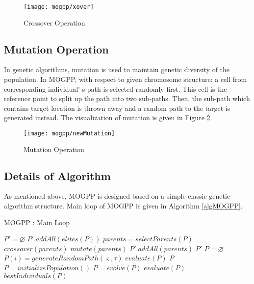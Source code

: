 \begin{figure}
\centering
\texttt{[image: mogpp/xover]}
\caption{Crossover Operation}
\label{fig:xover}
\end{figure}

\subsection{Mutation Operation}

In genetic algorithms, mutation is used to maintain genetic diversity of the population. In MOGPP, with respect to given chromosome structure; a cell from corresponding individual' s path is selected randomly first. This cell is the reference point to split up the path into two sub-paths. Then, the sub-path which contains target location is thrown away and a random path to the target is generated instead. The visualization of mutation is given in Figure \ref{fig:mutation}.

\begin{figure}
\centering
\texttt{[image: mogpp/newMutation]}
\caption{Mutation Operation}
\label{fig:mutation}
\end{figure}

\subsection{Details of Algorithm}

As mentioned above, MOGPP is designed based on a simple classic genetic algorithm structure. Main loop of MOGPP is given in Algorithm \ref{algMOGPP}.

\begin{algorithm}
	\caption{MOGPP : Main Loop}
	\label{algMOGPP}
    \begin{algorithmic}[1]
	  	\State $P' = \varnothing$
	  	\State $P'.addAll(elites(P))$
	  		\State $parents = selectParents(P)$
	  		\State $crossover(parents)$
	  		\State $mutate(parents)$
		  	\State $P'.addAll(parents)$
	  	\EndWhile
	  	\State \Return $P'$
      \EndFunction
   	  \Statex
      	\State $P = \varnothing$
      		\State $P(i) = generateRandomPath(\varsigma, \tau)$
      	\EndFor
      	\State $evaluate(P)$
		\State \Return $P$
	  \EndFunction
	  \Statex
      	\State $P = initializePopulation()$
    	      	\State $P = evolve(P)$
    	      	\State $evaluate(P)$
		\EndWhile
		\State \Return $bestIndividuals(P)$
  	  \EndFunction
	\end{algorithmic}
\end{algorithm}

